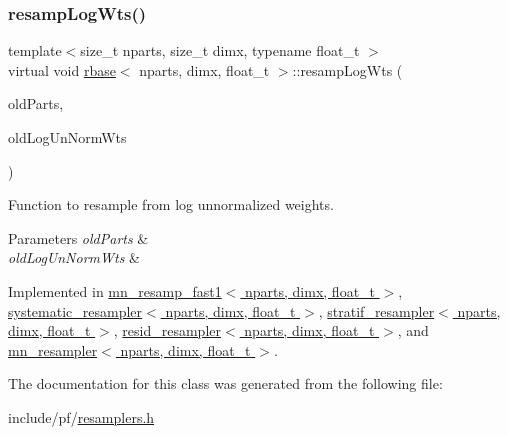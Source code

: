 \subsubsection{\texorpdfstring{resamp\+Log\+Wts()}{resampLogWts()}}
{\footnotesize\ttfamily template$<$size\+\_\+t nparts, size\+\_\+t dimx, typename float\+\_\+t $>$ \\
virtual void \hyperlink{classrbase}{rbase}$<$ nparts, dimx, float\+\_\+t $>$\+::resamp\+Log\+Wts (\begin{DoxyParamCaption}\item[{\hyperlink{classrbase_aa12fc826befa6ba0647b5f59ebc396ee}{array\+Vec} \&}]{old\+Parts,  }\item[{\hyperlink{classrbase_a6f76bef853e508cb5b6f546d231b06f5}{array\+Float} \&}]{old\+Log\+Un\+Norm\+Wts }\end{DoxyParamCaption})\hspace{0.3cm}{\ttfamily [pure virtual]}}



Function to resample from log unnormalized weights. 


\begin{DoxyParams}{Parameters}
{\em old\+Parts} & \\
\hline
{\em old\+Log\+Un\+Norm\+Wts} & \\
\hline
\end{DoxyParams}


Implemented in \hyperlink{classmn__resamp__fast1_a398e64faa29bafd345c0258ca90d489c}{mn\+\_\+resamp\+\_\+fast1$<$ nparts, dimx, float\+\_\+t $>$}, \hyperlink{classsystematic__resampler_a9467aec6002043f35f40e9e4857021ed}{systematic\+\_\+resampler$<$ nparts, dimx, float\+\_\+t $>$}, \hyperlink{classstratif__resampler_a2588147563bf3fe598e262cae7e125e6}{stratif\+\_\+resampler$<$ nparts, dimx, float\+\_\+t $>$}, \hyperlink{classresid__resampler_ae6957cd1e080ac4313e6b0bc5ae9aa96}{resid\+\_\+resampler$<$ nparts, dimx, float\+\_\+t $>$}, and \hyperlink{classmn__resampler_a13b1897e180a791a3a099d5d6329a125}{mn\+\_\+resampler$<$ nparts, dimx, float\+\_\+t $>$}.



The documentation for this class was generated from the following file\+:\begin{DoxyCompactItemize}
\item 
include/pf/\hyperlink{resamplers_8h}{resamplers.\+h}\end{DoxyCompactItemize}
